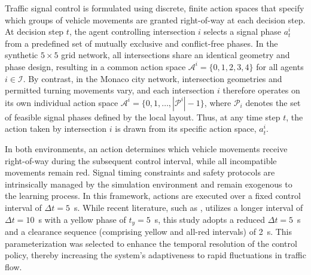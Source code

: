 \documentclass[lettersize,journal]{IEEEtran}
\begin{document}
Traffic signal control is formulated using discrete, finite action spaces that specify which groups of vehicle movements are granted right-of-way at each decision step. At decision step $t$, the agent controlling intersection $i$ selects a signal phase $a_t^i$ from a predefined set of mutually exclusive and conflict-free phases. 
In the synthetic $5\times5$ grid network, all intersections share an identical geometry and phase design, resulting in a common action space $\mathcal{A}^i = \{0, 1, 2, 3, 4\}$ for all agents $i \in \mathcal{I}$. By contrast, in the Monaco city network, intersection geometries and permitted turning movements vary, and each intersection $i$ therefore operates on its own individual action space $\mathcal{A}^i = \{0, 1, \dots, |\mathcal{P}^i| - 1\}$, where $\mathcal{P}_i$ denotes the set of feasible signal phases defined by the local layout. Thus, at any time step $t$, the action taken by intersection $i$ is drawn from its specific action space, $a_t^i$.

In both environments, an action determines which vehicle movements receive right-of-way during the subsequent control interval, while all incompatible movements remain red.
Signal timing constraints and safety protocols are intrinsically managed by the simulation environment and remain exogenous to the learning process. In this framework, actions are executed over a fixed control interval of $\Delta t = 5$~s. While recent literature, such as \cite{aslani2017adaptive}, utilizes a longer interval of $\Delta t = 10$~s with a yellow phase of $t_y = 5$~s, this study adopts a reduced $\Delta t = 5$~s and a clearance sequence (comprising yellow and all-red intervals) of 2~s. This parameterization was selected to enhance the temporal resolution of the control policy, thereby increasing the system's adaptiveness to rapid fluctuations in traffic flow. 
\end{document}
